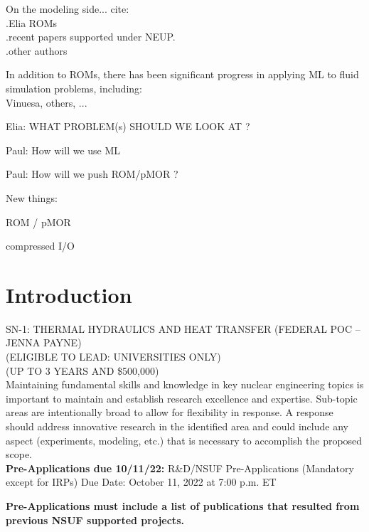 On the modeling side...  cite: \\
.Elia ROMs \\
.recent papers supported under NEUP. \\
.other authors

In addition to ROMs, there has been significant progress in applying
ML to fluid simulation problems, including: \\
Vinuesa, others, ...


Elia: WHAT PROBLEM(s) SHOULD WE LOOK AT ?

Paul: How will we use ML

Paul: How will we push ROM/pMOR ?









New things:

ROM / pMOR

compressed I/O

















\section{Introduction}

SN-1: THERMAL HYDRAULICS AND HEAT TRANSFER (FEDERAL POC – JENNA PAYNE) \\
(ELIGIBLE TO LEAD: UNIVERSITIES ONLY) \\
(UP TO 3 YEARS AND \$500,000) \\

Maintaining fundamental skills and knowledge in key nuclear engineering topics
is important to maintain and establish research excellence and expertise.
Sub-topic areas are intentionally broad to allow for flexibility in response. A
response should address innovative research in the identified area and could
include any aspect (experiments, modeling, etc.) that is necessary to
accomplish the proposed scope.
\\

{\bf Pre-Applications due 10/11/22:}
R\&D/NSUF Pre-Applications (Mandatory except for IRPs) Due Date: October 11, 2022 at 7:00 p.m. ET


{\bf
Pre-Applications must include a list of publications
that resulted from previous NSUF supported projects.
}


